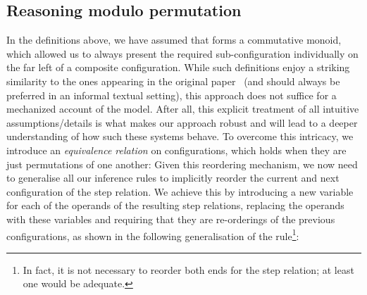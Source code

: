 \documentclass[acmsmall,nonacm=true,screen=true]{acmart}
\begin{document}
\subsection{Reasoning modulo permutation}
In the definitions above, we have assumed that \inlineMonoid{} forms a commutative monoid, which allowed us
to always present the required sub-configuration individually on the far left of a composite configuration.
While such definitions enjoy a striking similarity to the ones appearing in the original paper~\cite{bitml}
(and should always be preferred in an informal textual setting),
this approach does not suffice for a mechanized account of the model.
After all, this explicit treatment of all intuitive assumptions/details is what makes our approach robust and will lead to
a deeper understanding of how such these systems behave. 
To overcome this intricacy, we introduce an \textit{equivalence relation} on configurations, which holds when
they are just permutations of one another:
\BITreordering{}
Given this reordering mechanism, we now need to generalise all our inference rules to implicitly
reorder the current and next configuration of the step relation.
We achieve this by introducing a new variable for each of the operands of the resulting step relations,
replacing the operands with these variables and requiring that they are
re-orderings of the previous configurations, as shown in the following generalisation of the \inlineAuthJoinRule{} rule\footnote{
In fact, it is not necessary to reorder both ends for the step relation; at least one would be adequate.
}:
\BITgeneralRule{}
\end{document}
